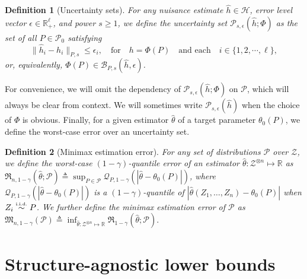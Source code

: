 \documentclass{article}
\def\eps{{\epsilon}}
\def\gB{{\mathcal{B}}}
\def\gH{{\mathcal{H}}}
\def\gP{{\mathcal{P}}}
\def\gQ{{\mathcal{Q}}}
\def\gZ{{\mathcal{Z}}}
\newcommand{\R}{\mathbb{R}}
\newcommand{\iid}{\textrm{i.i.d.}\xspace}
\def\defeq{\triangleq} %
\newcommand{\simiid}{\overset{\textrm{\tiny\iid}}{\sim}}
\newtheorem{definition}{Definition}[section]
\begin{document}
\begin{definition}[Uncertainty sets]
\label{def:uncertainty-set}
    For any nuisance estimate $\hat{h}\in\gH$, error level vector  $\eps\in\R_{+}^\ell$, and power $s\geq 1$, we define the uncertainty set $\gP_{s,\eps}(\hat{h};\Phi)$ as the set of all $P\in\gP_0$ satisfying %
    \begin{equation}
        \label{eq:oracle}
        \|\hat{h}_i-h_i\|_{P,s} \leq \eps_{i},\quad\text{for} \quad h = \Phi(P) \quad\text{and each}\quad i\in \{1,2,\cdots,\ell\},
    \end{equation}
    or, equivalently, $\Phi(P) \in \gB_{P,s}(\hat{h}, \eps)$.
\end{definition}

%
%
%
%
%
%
%
%
%
%
%
%
%
%
%
%
%
%
%
%
%
%
%
%
%

%
%





%

%
%
%
%
%

For convenience, we will omit the dependency of $\gP_{s,\eps}(\hat{h};\Phi)$ on $\gP$, which will always be clear from context.
We will sometimes write $\gP_{s,\eps}(\hat{h})$ when the choice of $\Phi$ is obvious.
%
%
Finally, for a given estimator $\hat{\theta}$ of a target parameter $\theta_0(P)$, we define the worst-case error  over an uncertainty set.

\begin{definition}[Minimax estimation error]
    \label{def:minimax-risk}
    For any set of distributions $\gP$ over $\gZ$, we define the worst-case $(1-\gamma)$-quantile error of an estimator $\hat{\theta}:\gZ^{\otimes n}\mapsto\R$ as
    $\mathfrak{R}_{n,1-\gamma}(\hat{\theta}; \gP) \defeq \sup_{P\in\gP}\gQ_{P,1-\gamma}(|\hat{\theta} - \theta_0(P)|)$, where 
    $\gQ_{P,1-\gamma}(|\hat{\theta} - \theta_0(P)|)$ is a $(1-\gamma)$-quantile of $|\hat{\theta}(Z_1, \dots, Z_n)- \theta_0(P)|$ when $Z_i\simiid P$.
    We further define the minimax estimation error of $\gP$ as $\mathfrak{M}_{n,1-\gamma}(\gP) \defeq \inf_{\hat{\theta}:\gZ^{\otimes n}\mapsto\R} \mathfrak{R}_{1-\gamma}(\hat{\theta}; \gP).$
\end{definition}







%
\section{Structure-agnostic lower bounds} %
\label{sec:optimality-of-dml}
\end{document}

